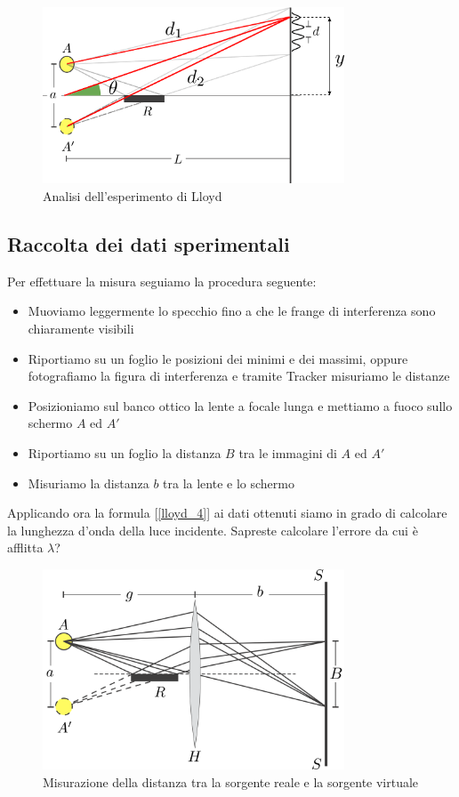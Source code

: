 \documentclass[a4paper,10pt,oneside]{article}
\begin{document}
\begin{figure}[H]
 \centering
 \includegraphics[width=0.8\textwidth]{./Immagini/lloyd3.png}
 \caption{Analisi dell'esperimento di Lloyd}
 \label{fig:lloyd_3}
\end{figure}
\subsection*{Raccolta dei dati sperimentali}
Per effettuare la misura seguiamo la procedura seguente:
\begin{itemize}
 \item Muoviamo leggermente lo specchio fino a che le frange di interferenza sono chiaramente visibili
\item Riportiamo su un foglio le posizioni dei minimi e dei massimi, oppure fotografiamo la figura di interferenza e tramite Tracker misuriamo le distanze
\item Posizioniamo sul banco ottico la lente a focale lunga e mettiamo a fuoco sullo schermo $A$ ed $A'$
\item Riportiamo su un foglio la distanza $B$ tra le immagini di $A$ ed $A'$
\item Misuriamo la distanza $b$ tra la lente e lo schermo
\end{itemize}
Applicando ora la formula [\ref{lloyd_4}] ai dati ottenuti siamo in grado di calcolare la lunghezza d'onda della luce incidente. Sapreste calcolare l'errore da cui è afflitta $\lambda$?
\begin{figure}[H]
 \centering
 \includegraphics[width=0.8\textwidth]{./Immagini/lloyd2.png}
 \caption{Misurazione della distanza tra la sorgente reale e la sorgente virtuale}
 \label{fig:lloyd2}
\end{figure}
\end{document}
